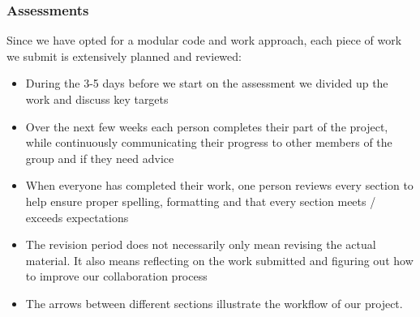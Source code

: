 \documentclass[coverpage,lineno]{../custom}
\begin{document}
\subsubsection{Assessments}
Since we have opted for a modular code and work approach, each piece of work we submit is extensively planned and reviewed:
\begin{itemize}
    \item During the 3-5 days before we start on the assessment we divided up the work and discuss key targets
    \item Over the next few weeks each person completes their part of the project, while continuously communicating their progress to other members of the group  and if they need advice
    \item When everyone has completed their work, one person reviews every section to help ensure proper spelling, formatting and that every section meets / exceeds expectations
    \item The revision period does not necessarily only mean revising the actual material. It also means reflecting on the work submitted and figuring out how to improve our collaboration process
    \item The arrows between different sections illustrate the workflow of our project. 
\end{itemize}
\end{document}

